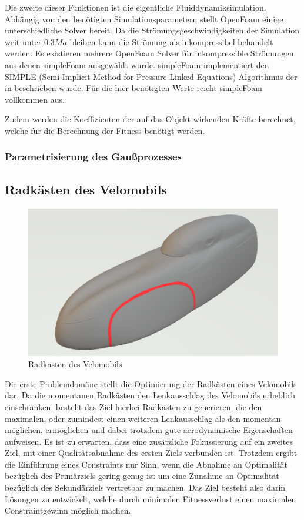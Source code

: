 Die zweite dieser Funktionen ist die eigentliche Fluiddynamiksimulation.
Abhängig von den benötigten Simulationsparametern stellt OpenFoam einige unterschiedliche Solver bereit.
Da die Strömungsgeschwindigkeiten der Simulation weit unter $0.3Ma$ bleiben kann die Strömung als inkompressibel behandelt werden.
Es existieren mehrere OpenFoam Solver für inkompressible Strömungen aus denen simpleFoam ausgewählt wurde.
simpleFoam implementiert den SIMPLE (Semi-Implicit Method for Pressure Linked Equations) Algorithmus der in \cite{Caretto.1973} beschrieben wurde.
Für die hier benötigten Werte reicht simpleFoam vollkommen aus.

Zudem werden die Koeffizienten der auf das Objekt wirkenden Kräfte berechnet, welche für die Berechnung der Fitness benötigt werden. 

\subsubsection{Parametrisierung des Gaußprozesses}



\subsection{Radkästen des Velomobils}

\begin{figure}[h]
	\centering
	\includegraphics[width=.8\linewidth]{bilder/velo_wheelcase}
	\caption{Radkasten des Velomobils}
	\label{fig:wheelcase}
\end{figure}

Die erste Problemdomäne stellt die Optimierung der Radkästen eines Velomobils dar.
Da die momentanen Radkästen den Lenkausschlag des Velomobils erheblich einschränken, besteht das Ziel hierbei Radkästen zu generieren, die den maximalen, oder zumindest einen weiteren Lenkausschlag als den momentan möglichen, ermöglichen und dabei trotzdem gute aerodynamische Eigenschaften aufweisen.
Es ist zu erwarten, dass eine zusätzliche Fokussierung auf ein zweites Ziel, mit einer Qualitätsabnahme des ersten Ziels verbunden ist.
Trotzdem ergibt die Einführung eines Constraints nur Sinn, wenn die Abnahme an Optimalität bezüglich des Primärziels gering genug ist um eine Zunahme an Optimalität bezüglich des Sekundärziels vertretbar zu machen.
Das Ziel besteht also darin Lösungen zu entwickelt, welche durch minimalen Fitnessverlust einen maximalen Constraintgewinn möglich machen.

